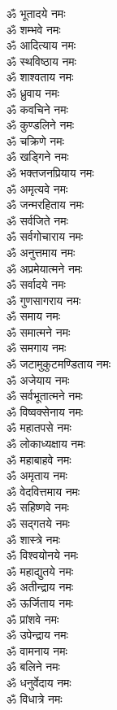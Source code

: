 \begin{multicols}{2}
\begin{flushleft}
ॐ भूतादये नमः\\
ॐ शम्भवे नमः\\
ॐ आदित्याय नमः\\
ॐ स्थविष्ठाय नमः\\
ॐ शाश्वताय नमः\\
ॐ ध्रुवाय नमः\hfill{}\\
ॐ कवचिने नमः\\
ॐ कुण्डलिने नमः\\
ॐ चक्रिणे नमः\\
ॐ खड्गिने नमः\\
ॐ भक्तजनप्रियाय नमः\\
ॐ अमृत्यवे नमः\\
ॐ जन्मरहिताय नमः\\
ॐ सर्वजिते नमः\\
ॐ सर्वगोचाराय नमः\\
ॐ अनुत्तमाय नमः\hfill{}\\
ॐ अप्रमेयात्मने नमः\\
ॐ सर्वादये नमः\\
ॐ गुणसागराय नमः\\
ॐ समाय नमः\\
ॐ समात्मने नमः\\
ॐ समगाय नमः\\
ॐ जटामुकुटमण्डिताय नमः\\
ॐ अजेयाय नमः\\
ॐ सर्वभूतात्मने नमः\\
ॐ विष्वक्सेनाय नमः\hfill{}\\
ॐ महातपसे नमः\\
ॐ लोकाध्यक्षाय नमः\\
ॐ महाबाहवे नमः\\
ॐ अमृताय नमः\\
ॐ वेदवित्तमाय नमः\\
ॐ सहिष्णवे नमः\\
ॐ सद्गतये नमः\\
ॐ शास्त्रे नमः\\
ॐ विश्वयोनये नमः\\
ॐ महाद्युतये नमः\hfill{}\\
ॐ अतीन्द्राय नमः\\
ॐ ऊर्जिताय नमः\\
ॐ प्रांशवे नमः\\
ॐ उपेन्द्राय नमः\\
ॐ वामनाय नमः\\
ॐ बलिने नमः\\
ॐ धनुर्वेदाय नमः\\
ॐ विधात्रे नमः\\

\end{flushleft}
\end{multicols}
